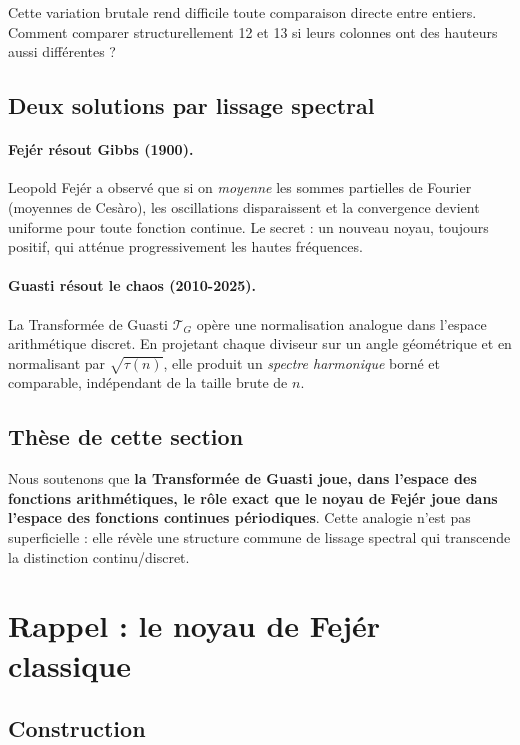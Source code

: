 \documentclass[12pt,a4paper]{article}
\theoremstyle{definition}
\theoremstyle{remark}
\newcommand{\TransformeeG}{\mathcal{T}_G}    %
\begin{document}
Cette variation brutale rend difficile toute comparaison directe entre entiers. Comment comparer structurellement 12 et 13 si leurs colonnes ont des hauteurs aussi différentes ?

\subsection{Deux solutions par lissage spectral}

\paragraph{Fejér résout Gibbs (1900).}
Leopold Fejér a observé que si on \emph{moyenne} les sommes partielles de Fourier (moyennes de Cesàro), les oscillations disparaissent et la convergence devient uniforme pour toute fonction continue. Le secret : un nouveau noyau, toujours positif, qui atténue progressivement les hautes fréquences.

\paragraph{Guasti résout le chaos (2010-2025).}
La Transformée de Guasti $\TransformeeG$ opère une normalisation analogue dans l'espace arithmétique discret. En projetant chaque diviseur sur un angle géométrique et en normalisant par $\sqrt{\tau(n)}$, elle produit un \emph{spectre harmonique} borné et comparable, indépendant de la taille brute de $n$.

\subsection{Thèse de cette section}

Nous soutenons que \textbf{la Transformée de Guasti joue, dans l'espace des fonctions arithmétiques, le rôle exact que le noyau de Fejér joue dans l'espace des fonctions continues périodiques}. Cette analogie n'est pas superficielle : elle révèle une structure commune de lissage spectral qui transcende la distinction continu/discret.

\section{Rappel : le noyau de Fejér classique}

\subsection{Construction}
\end{document}
